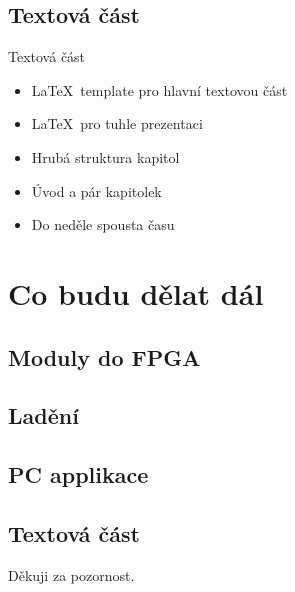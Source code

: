 \documentclass{beamer}
\begin{document}
	\subsection{Textová část}
		\begin{frame}{Textová část}
			\begin{itemize}
				\item \LaTeX\ template pro hlavní textovou část
				\item \LaTeX\  pro tuhle prezentaci
				\item Hrubá struktura kapitol
				\item Úvod a pár kapitolek
				\item Do neděle spousta času
			\end{itemize}		
		\end{frame}

\section{Co budu dělat dál}

\subsection{Moduly do FPGA}
\subsection{Ladění}
\subsection{PC applikace}
\subsection{Textová část}

\begin{frame}{}
	\Huge Děkuji za pozornost.
\end{frame}
\end{document}
